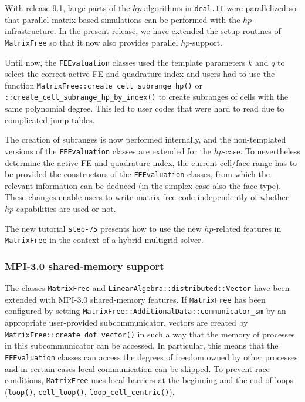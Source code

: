 \documentclass{ansarticle-preprint}
\newcommand{\specialword}[1]{\texttt{#1}}
\newcommand{\dealii}{{\specialword{deal.II}}\xspace}
\begin{document}
With release 9.1, large parts of the $hp$-algorithms in \dealii were parallelized so that
parallel matrix-based simulations can be performed with the $hp$-infrastructure. In the present
release, we have extended the setup routines of \texttt{MatrixFree} so that it now also
provides parallel $hp$-support.

Until now, the \texttt{FEEvaluation} classes used the template parameters $k$ and $q$ to select the correct active FE and quadrature index and users had
to use the function \texttt{MatrixFree::create\_cell\_\allowbreak subrange\_\allowbreak hp()} or
\texttt{::create\_cell\_\allowbreak subrange\_\allowbreak hp\_\allowbreak by\_index()} to create subranges of cells with
the same polynomial degree. This led to user codes that were hard to read due to complicated jump tables.

The creation of subranges is now performed internally, and the non-templated versions
of the \texttt{FEEvaluation} classes are extended for the $hp$-case. To nevertheless determine
the active FE and quadrature index, the current cell/face range has to be provided
the constructors of the \texttt{FEEvaluation} classes, from which the relevant information
can be deduced (in the simplex case also the face type). These changes enable
users to write matrix-free code independently of whether $hp$-capabilities are used or not.

The new tutorial \texttt{step-75} presents how to use the new $hp$-related features in \texttt{MatrixFree}
in the context of a hybrid-multigrid solver.

\subsubsection{MPI-3.0 shared-memory support}
The classes \texttt{MatrixFree} and \texttt{LinearAlgebra::\allowbreak distributed::\allowbreak Vector} have been extended with
MPI-3.0 shared-memory features. If \texttt{MatrixFree} has been configured by setting
\texttt{MatrixFree::AdditionalData::communicator\_sm} by an appropriate user-provided subcommunicator,
vectors are created by \texttt{MatrixFree::create\_dof\_vector()} in such a way that the
memory of processes in this subcommunicator can be accessed. In particular, this means
that the \texttt{FEEvaluation} classes can access the degrees of freedom owned by
other processes and in certain cases local
communication can be skipped. To prevent race conditions, \texttt{MatrixFree} uses local
barriers at the beginning and the end of loops (\texttt{loop()}, \texttt{cell\_loop()}, \texttt{loop\_cell\_centric()}).
\end{document}
